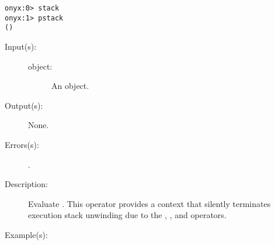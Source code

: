 \begin{description}
\begin{description}
\begin{verbatim}
onyx:0> stack
onyx:1> pstack
()
		\end{verbatim}
	\end{description}
\label{systemdict:start}
\item[{\onyxop{object}{start}{--}}: ]
	\begin{description}\item[]
	\item[Input(s): ]
		\begin{description}\item[]
		\item[object: ]
			An object.
		\end{description}
	\item[Output(s): ] None.
	\item[Errors(s): ]
		\begin{description}\item[]
		\item[.]
		\end{description}
	\item[Description: ]
		Evaluate .  This operator provides a context that
		silently terminates execution stack unwinding due to the
		,
		, and
		 operators.
	\item[Example(s): ]\begin{verbatim}


\end{verbatim}
\end{description}
\end{description}

